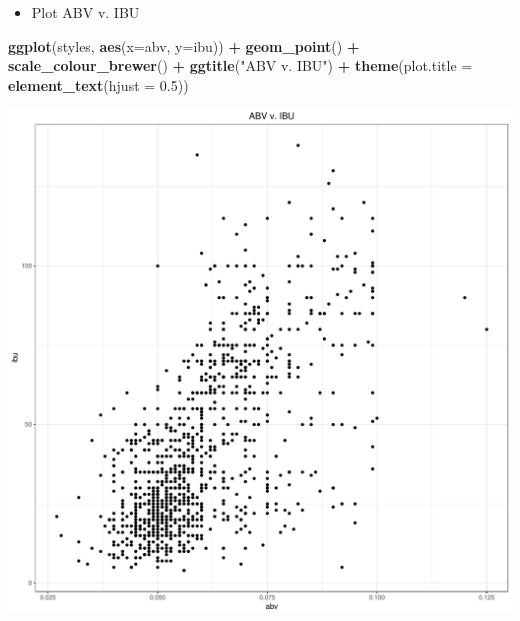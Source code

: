 \documentclass[]{article}
\newenvironment{Shaded}{\begin{snugshade}}{\end{snugshade}}
\newcommand{\KeywordTok}[1]{\textcolor[rgb]{0.13,0.29,0.53}{\textbf{#1}}}
\newcommand{\DataTypeTok}[1]{\textcolor[rgb]{0.13,0.29,0.53}{#1}}
\newcommand{\FloatTok}[1]{\textcolor[rgb]{0.00,0.00,0.81}{#1}}
\newcommand{\StringTok}[1]{\textcolor[rgb]{0.31,0.60,0.02}{#1}}
\newcommand{\CommentTok}[1]{\textcolor[rgb]{0.56,0.35,0.01}{\textit{#1}}}
\newcommand{\OperatorTok}[1]{\textcolor[rgb]{0.81,0.36,0.00}{\textbf{#1}}}
\newcommand{\NormalTok}[1]{#1}
\providecommand{\tightlist}{%
  \setlength{\itemsep}{0pt}\setlength{\parskip}{0pt}}
\begin{document}
\begin{Shaded}
\end{Shaded}

\begin{itemize}
\tightlist
\item
  Plot ABV v. IBU
\end{itemize}

\begin{Shaded}
\begin{Highlighting}[]
\KeywordTok{ggplot}\NormalTok{(styles, }\KeywordTok{aes}\NormalTok{(}\DataTypeTok{x=}\NormalTok{abv, }\DataTypeTok{y=}\NormalTok{ibu)) }\OperatorTok{+}
\StringTok{  }\KeywordTok{geom_point}\NormalTok{() }\OperatorTok{+}
\StringTok{  }\KeywordTok{scale_colour_brewer}\NormalTok{() }\OperatorTok{+}
\StringTok{  }\KeywordTok{ggtitle}\NormalTok{(}\StringTok{"ABV v. IBU"}\NormalTok{) }\OperatorTok{+}
\StringTok{  }\KeywordTok{theme}\NormalTok{(}\DataTypeTok{plot.title =} \KeywordTok{element_text}\NormalTok{(}\DataTypeTok{hjust =} \FloatTok{0.5}\NormalTok{))}
\end{Highlighting}
\end{Shaded}

\begin{center}\includegraphics{Analysis_Final_files/figure-latex/unnamed-chunk-21-1} \end{center}
\end{document}
